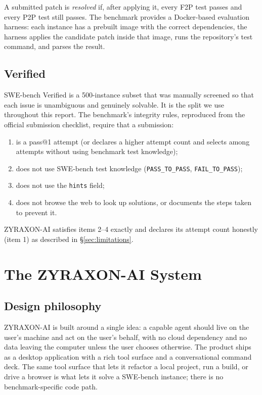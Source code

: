 \documentclass[11pt,a4paper]{article}
\begin{document}
A submitted patch is \emph{resolved} if, after applying it, every F2P test passes and
every P2P test still passes. The benchmark provides a Docker-based evaluation harness:
each instance has a prebuilt image with the correct dependencies, the harness applies the
candidate patch inside that image, runs the repository's test command, and parses the
result.

\subsection{Verified}

SWE-bench Verified \cite{openai2024verified} is a 500-instance subset that was manually
screened so that each issue is unambiguous and genuinely solvable. It is the split we use
throughout this report. The benchmark's integrity rules, reproduced from the official
submission checklist, require that a submission:

\begin{enumerate}[leftmargin=1.4em]
  \item is a pass@1 attempt (or declares a higher attempt count and selects among
  attempts without using benchmark test knowledge);
  \item does not use SWE-bench test knowledge (\texttt{PASS\_TO\_PASS},
  \texttt{FAIL\_TO\_PASS});
  \item does not use the \texttt{hints} field;
  \item does not browse the web to look up solutions, or documents the steps taken to
  prevent it.
\end{enumerate}

ZYRAXON-AI satisfies items 2--4 exactly and declares its attempt count honestly
(item 1) as described in \S\ref{sec:limitations}.

\section{The ZYRAXON-AI System}
\label{sec:system}

\subsection{Design philosophy}

ZYRAXON-AI is built around a single idea: a capable agent should live on the user's
machine and act on the user's behalf, with no cloud dependency and no data leaving the
computer unless the user chooses otherwise. The product ships as a desktop application
with a rich tool surface and a conversational command deck. The same tool surface that
lets it refactor a local project, run a build, or drive a browser is what lets it solve a
SWE-bench instance; there is no benchmark-specific code path.
\end{document}
